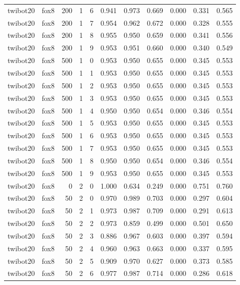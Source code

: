 \begin{tabular}{llrrrrrrrrr}
twibot20 & fox8 & 200 & 1 & 6 & 0.941 & 0.973 & 0.669 & 0.000 & 0.331 & 0.565 \\
twibot20 & fox8 & 200 & 1 & 7 & 0.954 & 0.962 & 0.672 & 0.000 & 0.328 & 0.555 \\
twibot20 & fox8 & 200 & 1 & 8 & 0.955 & 0.950 & 0.659 & 0.000 & 0.341 & 0.556 \\
twibot20 & fox8 & 200 & 1 & 9 & 0.953 & 0.951 & 0.660 & 0.000 & 0.340 & 0.549 \\
twibot20 & fox8 & 500 & 1 & 0 & 0.953 & 0.950 & 0.655 & 0.000 & 0.345 & 0.553 \\
twibot20 & fox8 & 500 & 1 & 1 & 0.953 & 0.950 & 0.655 & 0.000 & 0.345 & 0.553 \\
twibot20 & fox8 & 500 & 1 & 2 & 0.953 & 0.950 & 0.655 & 0.000 & 0.345 & 0.553 \\
twibot20 & fox8 & 500 & 1 & 3 & 0.953 & 0.950 & 0.655 & 0.000 & 0.345 & 0.553 \\
twibot20 & fox8 & 500 & 1 & 4 & 0.950 & 0.950 & 0.654 & 0.000 & 0.346 & 0.554 \\
twibot20 & fox8 & 500 & 1 & 5 & 0.953 & 0.950 & 0.655 & 0.000 & 0.345 & 0.553 \\
twibot20 & fox8 & 500 & 1 & 6 & 0.953 & 0.950 & 0.655 & 0.000 & 0.345 & 0.553 \\
twibot20 & fox8 & 500 & 1 & 7 & 0.953 & 0.950 & 0.655 & 0.000 & 0.345 & 0.553 \\
twibot20 & fox8 & 500 & 1 & 8 & 0.950 & 0.950 & 0.654 & 0.000 & 0.346 & 0.554 \\
twibot20 & fox8 & 500 & 1 & 9 & 0.953 & 0.950 & 0.655 & 0.000 & 0.345 & 0.553 \\
twibot20 & fox8 & 0 & 2 & 0 & 1.000 & 0.634 & 0.249 & 0.000 & 0.751 & 0.760 \\
twibot20 & fox8 & 50 & 2 & 0 & 0.970 & 0.989 & 0.703 & 0.000 & 0.297 & 0.604 \\
twibot20 & fox8 & 50 & 2 & 1 & 0.973 & 0.987 & 0.709 & 0.000 & 0.291 & 0.613 \\
twibot20 & fox8 & 50 & 2 & 2 & 0.973 & 0.859 & 0.499 & 0.000 & 0.501 & 0.650 \\
twibot20 & fox8 & 50 & 2 & 3 & 0.886 & 0.967 & 0.603 & 0.000 & 0.397 & 0.594 \\
twibot20 & fox8 & 50 & 2 & 4 & 0.960 & 0.963 & 0.663 & 0.000 & 0.337 & 0.595 \\
twibot20 & fox8 & 50 & 2 & 5 & 0.909 & 0.970 & 0.627 & 0.000 & 0.373 & 0.585 \\
twibot20 & fox8 & 50 & 2 & 6 & 0.977 & 0.987 & 0.714 & 0.000 & 0.286 & 0.618 \\

\end{tabular}

